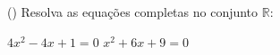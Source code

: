 \begin{question}[type=exam] () %
 Resolva as equações completas no conjunto $\mathbb{R}$:
\begin{tasks}
        \task $4x^2-4x+1=0$
        \task $x^2+6x+9=0$
    \end{tasks}
\end{question}
